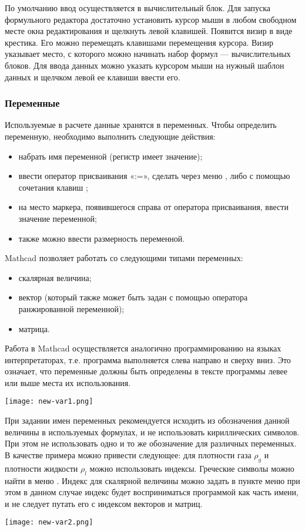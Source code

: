 По умолчанию ввод осуществляется в вычислительный блок. Для запуска формульного редактора достаточно установить курсор мыши в любом свободном месте окна редактирования и щелкнуть левой клавишей. Появится визир в виде крестика. Его можно перемещать клавишами перемещения курсора. Визир указывает место, с которого можно начинать набор формул --- вычислительных блоков. Для ввода данных можно указать курсором мыши на нужный шаблон данных и щелчком левой ее клавиши ввести его.


\subsubsection*{Переменные}
Используемые в расчете данные хранятся в переменных. Чтобы определить переменную, необходимо выполнить следующие действия:
\begin{itemize}
	\item набрать имя переменной (регистр имеет значение);
	\item ввести оператор присваивания «:=», сделать через меню  ,  либо с помощью сочетания клавиш \keys{:};
	\item на место маркера, появившегося справа от оператора присваивания, ввести значение переменной;
	\item также можно ввести размерность переменной.
\end{itemize}
Mathcad позволяет работать со следующими типами переменных:
\begin{itemize}
\item скалярная величина;
\item вектор (который также может быть задан с помощью оператора ранжированной переменной);
\item матрица.
\end{itemize}

Работа в Mathcad осуществляется аналогично программированию на языках интерпретаторах, т.е. программа выполняется слева направо и сверху вниз. Это означает, что переменные должны быть определены в тексте программы левее или выше места их использования.
\begin{center}
	\texttt{[image: new-var1.png]}
\end{center}

При задании имен переменных рекомендуется исходить из обозначения данной величины в используемых формулах, и не использовать кириллических символов. При этом не использовать одно и то же обозначение для различных переменных. В качестве примера можно привести следующее: для плотности газа $\rho_g$ и плотности жидкости $\rho_l$ можно использовать индексы. Греческие символы можно найти в меню  . Индекс для скалярной величины можно задать в пункте меню  при этом в данном случае индекс будет восприниматься программой как часть имени, и не следует путать его с индексом векторов и матриц.
\begin{center}
	\texttt{[image: new-var2.png]}
\end{center}


